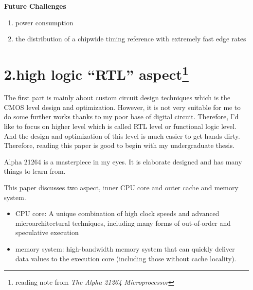 \documentclass[11pt]{article}
\begin{document}
\textbf{Future Challenges}
\begin{enumerate}
	\item power consumption
	\item the distribution of a chipwide timing reference with extremely fast edge rates
\end{enumerate}
\newpage
\section*{2.high logic ``RTL'' aspect\footnote{reading note from \textit{The Alpha 21264 Microprocessor}}}
The first part is mainly about custom circuit design techniques which is the CMOS level design and optimization. However, it is not very suitable for me to do some further works thanks to my poor base of digital circuit. Therefore, I'd like to focus on higher level which is called RTL level or functional logic level. And the design and optimization of this level is much easier to get hands dirty. Therefore, reading this paper is good to begin with my undergraduate thesis. 

Alpha 21264 is a masterpiece in my eyes. It is elaborate designed and has many things to learn from.

This paper discusses two aspect, inner CPU core and outer cache and memory system.
\begin{itemize}
	\item CPU core: A unique combination of high clock speeds and advanced microarchitectural techniques, including many forms of out-of-order and speculative execution
	\item memory system: high-bandwidth memory system that can quickly deliver data values to the execution core (including those without cache locality). 
\end{itemize}
\end{document}

